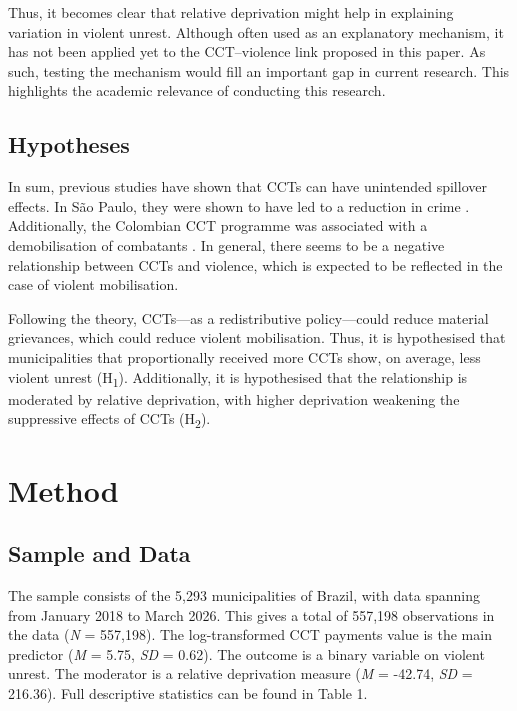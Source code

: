 \documentclass[stu,12pt]{apa7}
\begin{document}
Thus, it becomes clear that relative deprivation might help in explaining variation in violent unrest. Although often used as an explanatory mechanism, it has not been applied yet to the CCT–violence link proposed in this paper. As such, testing the mechanism would fill an important gap in current research. This highlights the academic relevance of conducting this research.

\subsection{Hypotheses}

In sum, previous studies have shown that CCTs can have unintended spillover effects. In São Paulo, they were shown to have led to a reduction in crime \parencite{chiodaSpilloversConditionalCash2016}. Additionally, the Colombian CCT programme was associated with a demobilisation of combatants \parencite{penaCivilConflictConditional2017}. In general, there seems to be a negative relationship between CCTs and violence, which is expected to be reflected in the case of violent mobilisation.

Following the theory, CCTs—as a redistributive policy—could reduce material grievances, which could reduce violent mobilisation. Thus, it is hypothesised that municipalities that proportionally received more CCTs show, on average, less violent unrest (H\textsubscript{1}). Additionally, it is hypothesised that the relationship is moderated by relative deprivation, with higher deprivation weakening the suppressive effects of CCTs (H\textsubscript{2}).

\section{Method}

\subsection{Sample and Data}

The sample consists of the 5,293 municipalities of Brazil, with data spanning from January 2018 to March 2026. This gives a total of 557,198 observations in the data (\textit{N} = 557,198). The log-transformed CCT payments value is the main predictor (\textit{M} = 5.75, \textit{SD} = 0.62). The outcome is a binary variable on violent unrest. The moderator is a relative deprivation measure (\textit{M} = -42.74, \textit{SD} = 216.36). Full descriptive statistics can be found in Table 1.
\end{document}
